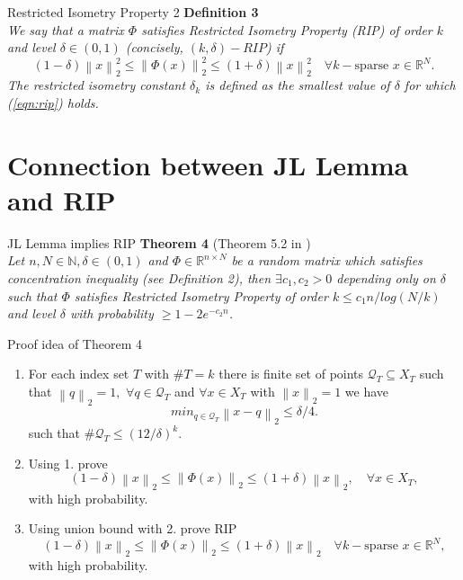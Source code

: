 \documentclass{beamer}
\newcommand\norm[1]{\left\lVert#1\right\rVert}
\newcommand*\by{{\times}}
\begin{document}
\begin{frame}{Restricted Isometry Property 2}
\noindent
{\bf Definition 3} \\
{\it
We say that a matrix $\Phi$ satisfies Restricted Isometry Property (RIP) of order $k$ and level $\delta \in (0, 1)$ (concisely, $(k, \delta)-RIP$) if 
\begin{equation}
\label{eqn:rip}
    (1-\delta) \norm{x}_2^2 \leq \norm{\Phi(x)}_2^2 \leq (1+\delta) \norm{x}_2^2 \quad \forall k-\text{sparse } x \in \mathbb{R}^N.
\end{equation}
The restricted isometry constant $\delta_k$ is defined as the smallest value of $\delta$ for which (\ref{eqn:rip}) holds.
}
    
\end{frame}


\section{Connection between JL Lemma and RIP}

\begin{frame}{JL Lemma implies RIP}
\noindent
{\bf Theorem 4} (Theorem 5.2 in \citep{isometry}) \\
{\it
Let $n, N \in \mathbb{N}, \delta \in (0, 1)$ and $\Phi \in \mathbb{R}^{n \by N}$ be a random matrix which satisfies concentration inequality (see Definition 2), then $\exists c_1, c_2 > 0$ depending only on $\delta$ such that $\Phi$ satisfies Restricted Isometry Property of order $k \leq c_1n/log(N/k)$ and level $\delta$ with probability $ \geq 1 - 2e^{-c_2n}$.
}
\end{frame}

\begin{frame}{Proof idea of Theorem 4}
\begin{enumerate}
    \item For each index set $T$ with $\#T = k$ there is finite set of points $\mathcal{Q}_T \subseteq X_T$ such that $\norm{q}_2 = 1,$ $\forall q \in \mathcal{Q}_T$ and $\forall x \in X_T$ with $\norm{x}_2 = 1$ we have 
\begin{equation}
\label{eqn:iso_cover}
    min_{q \in \mathcal{Q}_T} \norm{x-q}_2 \leq \delta/4.
\end{equation}
such that $\# \mathcal{Q}_T \leq (12/\delta)^k$.
\pause
    \item Using 1. prove 
    \begin{equation}
\label{eqn:iso1}    
(1 - \delta) \norm{x}_2 \leq \norm{\Phi(x)}_2 \leq (1 + \delta) \norm{x}_2, \quad \forall x \in X_T,
\end{equation}
with high probability.
\pause
    \item Using union bound with 2. prove RIP
    \begin{equation}
(1 - \delta) \norm{x}_2 \leq \norm{\Phi(x)}_2 \leq (1 + \delta) \norm{x}_2 \quad \forall k-\text{sparse } x \in \mathbb{R}^N,
    \end{equation}
with high probability. 
\end{enumerate}
    
\end{frame}
\end{document}
